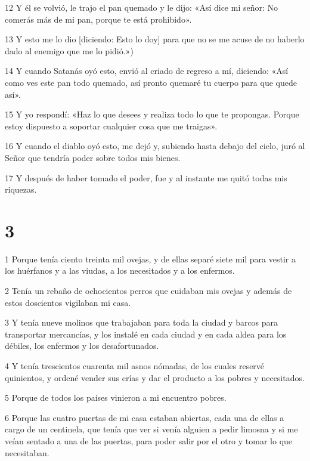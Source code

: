 \par 12 Y él se volvió, le trajo el pan quemado y le dijo: «Así dice mi señor: No comerás más de mi pan, porque te está prohibido».

\par 13 Y esto me lo dio [diciendo: Esto lo doy] para que no se me acuse de no haberlo dado al enemigo que me lo pidió.»)

\par 14 Y cuando Satanás oyó esto, envió al criado de regreso a mí, diciendo: «Así como ves este pan todo quemado, así pronto quemaré tu cuerpo para que quede así».

\par 15 Y yo respondí: «Haz lo que desees y realiza todo lo que te propongas. Porque estoy dispuesto a soportar cualquier cosa que me traigas».

\par 16 Y cuando el diablo oyó esto, me dejó y, subiendo hasta debajo del cielo, juró al Señor que tendría poder sobre todos mis bienes.

\par 17 Y después de haber tomado el poder, fue y al instante me quitó todas mis riquezas.

\chapter{3}

\par 1 Porque tenía ciento treinta mil ovejas, y de ellas separé siete mil para vestir a los huérfanos y a las viudas, a los necesitados y a los enfermos.

\par 2 Tenía un rebaño de ochocientos perros que cuidaban mis ovejas y además de estos doscientos vigilaban mi casa.

\par 3 Y tenía nueve molinos que trabajaban para toda la ciudad y barcos para transportar mercancías, y los instalé en cada ciudad y en cada aldea para los débiles, los enfermos y los desafortunados.

\par 4 Y tenía trescientos cuarenta mil asnos nómadas, de los cuales reservé quinientos, y ordené vender sus crías y dar el producto a los pobres y necesitados.

\par 5 Porque de todos los países vinieron a mi encuentro pobres.

\par 6 Porque las cuatro puertas de mi casa estaban abiertas, cada una de ellas a cargo de un centinela, que tenía que ver si venía alguien a pedir limosna y si me veían sentado a una de las puertas, para poder salir por el otro y tomar lo que necesitaban.

